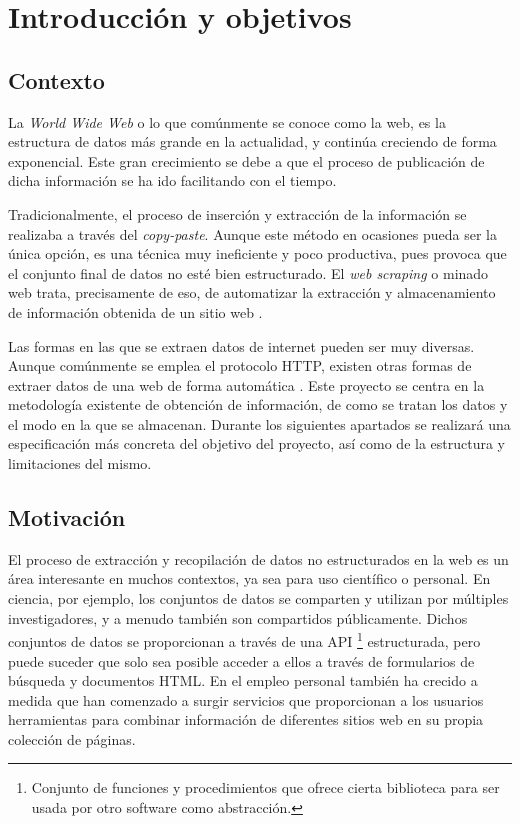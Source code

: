 \chapter{Introducción y objetivos}
\label{cha:introduccion y objetivos}

\section{Contexto}
\label{sec:contexto}

La \emph{World Wide Web} o lo que comúnmente se conoce como la web, es la estructura de datos más grande 
en la actualidad, y continúa creciendo de forma exponencial. Este gran crecimiento se debe a que el proceso 
de publicación de dicha información se ha ido facilitando con el tiempo.

Tradicionalmente, el proceso de inserción y extracción de la información se realizaba a través del
\emph{copy-paste}. Aunque este método en ocasiones pueda ser la única opción, es una técnica muy 
ineficiente y poco productiva, pues provoca que el conjunto final de datos no esté bien estructurado. El 
\emph{web scraping} o minado web trata, precisamente de eso, de automatizar la extracción y almacenamiento 
de información obtenida de un sitio web \cite{Andreas-Mehlfuhrer}.

Las formas en las que se extraen datos de internet pueden ser muy diversas. Aunque comúnmente se emplea 
el protocolo HTTP, existen otras formas de extraer datos de una web de forma automática
\cite{web-scraping-bozhao}. Este proyecto se centra en la metodología existente de obtención de
información, de como se tratan los datos y el modo en la que se almacenan. Durante los siguientes
apartados se realizará una especificación más concreta del objetivo del proyecto, así como de la
estructura y limitaciones del mismo.

\section{Motivación}
\label{sec:motivacion}

El proceso de extracción y recopilación de datos no estructurados en la web es un área interesante en
muchos contextos, ya sea para uso científico o personal. En ciencia, por ejemplo, los conjuntos de datos
se comparten y utilizan por múltiples investigadores, y a menudo también son compartidos públicamente.
Dichos conjuntos de datos se proporcionan a través de una API \footnote{Conjunto de funciones
y procedimientos que ofrece cierta biblioteca para ser usada por otro software como abstracción.}
estructurada, pero puede suceder que solo sea posible acceder a ellos a través de formularios de búsqueda
y documentos HTML. En el empleo personal también ha crecido a medida que han comenzado a surgir servicios 
que proporcionan a los usuarios herramientas para combinar información de diferentes sitios web en su propia
colección de páginas.

